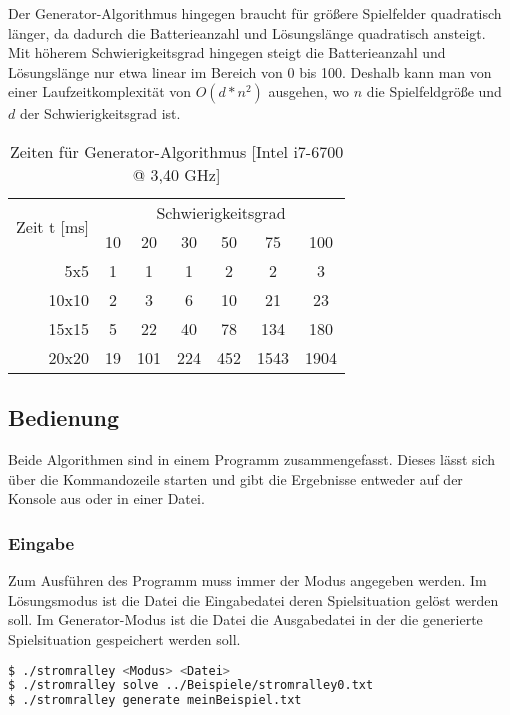 \documentclass[a4paper,10pt,ngerman]{scrartcl}
\begin{document}
Der Generator-Algorithmus hingegen braucht für größere Spielfelder quadratisch länger, da dadurch die Batterieanzahl und Lösungslänge quadratisch ansteigt.
Mit höherem Schwierigkeitsgrad hingegen steigt die Batterieanzahl und Lösungslänge nur etwa linear im Bereich von 0 bis 100.
Deshalb kann man von einer Laufzeitkomplexität von $O(d*n^2)$ ausgehen, wo $n$ die Spielfeldgröße und $d$ der Schwierigkeitsgrad ist.

\begin{table}[ht]
  \centering
  \begin{tabular}{|c|r|c|c|c|c|c|c|}
    \multicolumn{2}{c|}{\multirow{2}{*}{Zeit t [ms]}} & \multicolumn{6}{|c|}{Schwierigkeitsgrad} \\
    \cline{3-8}
    \multicolumn{2}{c|}{} & 10 & 20 & 30 & 50 & 75 & 100 \\
    \hline
    \parbox[t]{3mm}{}
    &   5x5 &  1 &    1 &    1 &    2 &    2 &    3 \\
    & 10x10 &  2 &    3 &    6 &   10 &   21 &   23 \\
    & 15x15 &  5 &   22 &   40 &   78 &  134 &  180 \\
    & 20x20 & 19 &  101 &  224 &  452 & 1543 & 1904 \\
    \hline
  \end{tabular}
  \caption{Zeiten für Generator-Algorithmus [Intel i7-6700 @ 3,40 GHz]}
  \label{tab:difpathcount}
\end{table}

\subsection{Bedienung}
Beide Algorithmen sind in einem Programm zusammengefasst.
Dieses lässt sich über die Kommandozeile starten und gibt die Ergebnisse entweder auf der Konsole aus oder in einer Datei.

\subsubsection{Eingabe}
Zum Ausführen des Programm muss immer der Modus angegeben werden.
Im Lösungsmodus ist die Datei die Eingabedatei deren Spielsituation gelöst werden soll.
Im Generator-Modus ist die Datei die Ausgabedatei in der die generierte Spielsituation gespeichert werden soll.

\begin{lstlisting}[language=bash, numbers=none, frame=single]
$ ./stromralley <Modus> <Datei>
$ ./stromralley solve ../Beispiele/stromralley0.txt
$ ./stromralley generate meinBeispiel.txt
\end{lstlisting}
\end{document}
